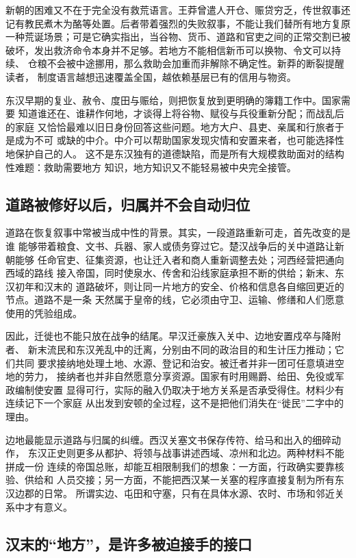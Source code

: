 新朝的困难又不在于完全没有救荒语言。王莽曾遣人开仓、赈贷穷乏，传世叙事还
记有教民煮木为酪等处置。后者带着强烈的失败叙事，不能让我们替所有地方复原
一种荒诞场景；可是它确实指出，当谷物、货币、道路和官吏之间的正常交割已被
破坏，发出救济命令本身并不足够。若地方不能相信新币可以换物、令文可以持续、
仓粮不会被中途挪用，那么救助会加重而非解除不确定性。新莽的断裂提醒读者，
制度语言越想迅速覆盖全国，越依赖基层已有的信用与物资。

东汉早期的复业、赦令、度田与赈给，则把恢复放到更明确的簿籍工作中。国家需要
知道谁还在、谁耕作何地，才谈得上将谷物、赋役与兵役重新分配；而战乱后的家庭
又恰恰最难以旧日身份回答这些问题。地方大户、县吏、亲属和行旅者于是成为不可
或缺的中介。中介可以帮助国家发现灾情和安置来者，也可能选择性地保护自己的人。
这不是东汉独有的道德缺陷，而是所有大规模救助面对的结构性难题：救助需要地方
知识，地方知识又不能轻易被中央完全接管。

\subsection{道路被修好以后，归属并不会自动归位}

道路在恢复叙事中常被当成中性的背景。其实，一段道路重新可走，首先改变的是谁
能够带着粮食、文书、兵器、家人或债务穿过它。楚汉战争后的关中道路让新朝能够
任命官吏、征集资源，也让迁入者和商人重新调整去处；河西经营把通向西域的路线
接入帝国，同时使泉水、传舍和沿线家庭承担不断的供给；新末、东汉初年和汉末的
道路破坏，则让同一片地方的安全、价格和信息各自缩回更近的节点。道路不是一条
天然属于皇帝的线，它必须由守卫、运输、修缮和人们愿意使用的凭验组成。

因此，迁徙也不能只放在战争的结尾。早汉迁豪族入关中、边地安置戍卒与降附者、
新末流民和东汉羌乱中的迁离，分别由不同的政治目的和生计压力推动；它们共同
要求接纳地处理土地、水源、登记和治安。被迁者并非一团可任意填进空地的劳力，
接纳者也并非自然愿意分享资源。国家有时用赐爵、给田、免役或军政编制使安置
显得可行，实际的融入仍取决于地方关系是否承受得住。材料少有连续记下一个家庭
从出发到安顿的全过程，这不是把他们消失在“徙民”二字中的理由。

边地最能显示道路与归属的纠缠。西汉关塞文书保存传符、给马和出入的细碎动作，
东汉正史则更多从都护、将领与战事讲述西域、凉州和北边。两种材料不能拼成一份
连续的帝国总账，却能互相限制我们的想象：一方面，行政确实要靠核验、供给和
人员交接；另一方面，不能把西汉某一关塞的程序直接复制为所有东汉边郡的日常。
所谓实边、屯田和守塞，只有在具体水源、农时、市场和邻近关系中才有意义。

\subsection{汉末的“地方”，是许多被迫接手的接口}

